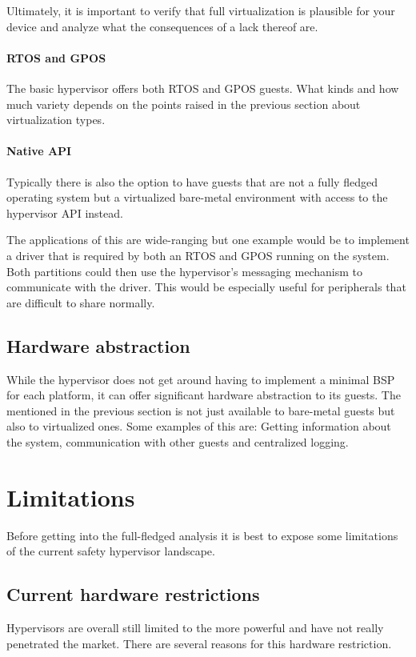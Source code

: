 Ultimately, it is important to verify that full virtualization is plausible for your device and analyze what the consequences of a lack thereof are.
\paragraph{\gls{RTOS} and \gls{GPOS}}
The basic hypervisor offers both \gls{RTOS} and \gls{GPOS} guests. What kinds and how much variety depends on the points raised in the previous section about virtualization types. 
\paragraph{Native \gls{API}}
Typically there is also the option to have guests that are not a fully fledged operating system but a virtualized bare-metal environment with access to the hypervisor \gls{API} instead. 

The applications of this are wide-ranging but one example would be to implement a driver that is required by both an \gls{RTOS} and \gls{GPOS} running on the system. Both partitions could then use the hypervisor's messaging mechanism to communicate with the driver. This would be especially useful for peripherals that are difficult to share normally.
\subsection{Hardware abstraction}
While the hypervisor does not get around having to implement a minimal \gls{BSP} for each platform, it can offer significant hardware abstraction to its guests. The  mentioned in the previous section is not just available to bare-metal guests but also to virtualized ones. Some examples of this are: Getting information about the system, communication with other guests and centralized logging.


\section{Limitations}
Before getting into the full-fledged analysis it is best to expose some limitations of the current safety hypervisor landscape. 
\subsection{Current hardware restrictions}
Hypervisors are overall still limited to the more powerful  and have not really penetrated the  market. There are several reasons for this hardware restriction. 

